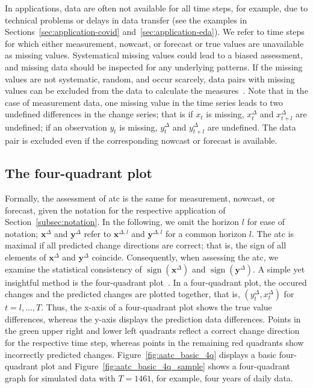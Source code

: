 \documentclass[pdflatex]{sn-jnl}
\theoremstyle{plain}%
\theoremstyle{definition}
\DeclareMathOperator{\sign}{sign}
\newcommand{\diffxl}{\mathbf{x}^{\Delta,l}}
\newcommand{\diffyl}{\mathbf{y}^{\Delta,l}}
\newcommand{\diffx}{\mathbf{x}^{\Delta}}
\newcommand{\diffy}{\mathbf{y}^{\Delta}}
\newcommand{\diffxt}[1][t]{x^{\Delta}_{#1}}
\newcommand{\diffyt}[1][t]{y^{\Delta}_{#1}}
\begin{document}
In applications, data are often not available for all time steps, for example, due to technical problems or delays in data transfer (see the examples in Sections~\ref{sec:application-covid} and~\ref{sec:application-eda}).
We refer to time steps for which either measurement, nowcast, or forecast or true values are unavailable as missing values.
Systematical missing values could lead to a biased assessment, and missing data should be inspected for any underlying patterns.
If the missing values are not systematic, random, and occur scarcely, data pairs with missing values can be excluded from the data to calculate the measures~\parencite[see][Section 1.3]{VanBuuren2018}.
Note that in the case of measurement data, one missing value in the time series leads to two undefined differences in the change series; that is if $x_t$ is missing, $\diffxt$ and $\diffxt[t+l]$ are undefined; if an observation $y_t$ is missing, $\diffyt$ and $\diffyt[t+l]$ are undefined.
The data pair is excluded even if the corresponding nowcast or forecast is available.



\subsection{The four-quadrant plot}\label{subsec:aatc-four-quadrant-plot}

Formally, the assessment of \ac{atc} is the same for measurement, nowcast, or forecast, given the notation for the respective application of Section~\ref{subsec:notation}.
In the following, we omit the horizon $l$ for ease of notation; $\diffx$ and $\diffy$ refer to $\diffxl$ and $\diffyl$ for a common horizon $l$.
The \ac{atc} is maximal if all predicted change directions are correct; that is, the sign of all elements of $\diffx$ and $\diffy$ coincide.
Consequently, when assessing the \ac{atc}, we examine the statistical consistency of $\sign(\diffx)$ and $\sign(\diffy)$.
A simple yet insightful method is the four-quadrant plot~\citep[see, e.g., ][]{Perrino1998, Saugel2015}.
In a four-quadrant plot, the occured changes and the predicted changes are plotted together, that is, $(\diffyt, \diffxt)$ for $t = l, \dots, T$.
Thus, the x-axis of a four-quadrant plot shows the true value differences, whereas the y-axis displays the prediction data differences.
Points in the green upper right and lower left quadrants reflect a correct change direction for the respective time step, whereas points in the remaining red quadrants show incorrectly predicted changes.
Figure~\ref{fig:aatc_basic_4q} displays a basic four-quadrant plot and Figure~\ref{fig:aatc_basic_4q_sample} shows a four-quadrant graph for simulated data with $T=1461$, for example, four years of daily data.
\end{document}
